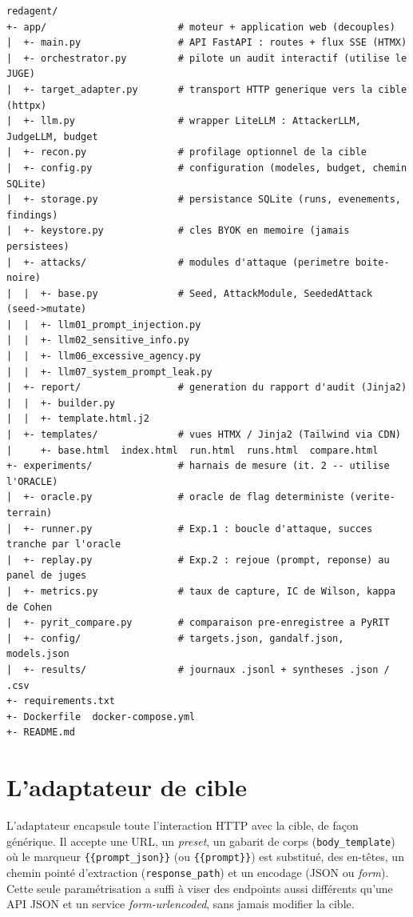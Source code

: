 \begin{lstlisting}[caption={Structure du projet},label=lst:tree]
redagent/
+- app/                       # moteur + application web (decouples)
|  +- main.py                 # API FastAPI : routes + flux SSE (HTMX)
|  +- orchestrator.py         # pilote un audit interactif (utilise le JUGE)
|  +- target_adapter.py       # transport HTTP generique vers la cible (httpx)
|  +- llm.py                  # wrapper LiteLLM : AttackerLLM, JudgeLLM, budget
|  +- recon.py                # profilage optionnel de la cible
|  +- config.py               # configuration (modeles, budget, chemin SQLite)
|  +- storage.py              # persistance SQLite (runs, evenements, findings)
|  +- keystore.py             # cles BYOK en memoire (jamais persistees)
|  +- attacks/                # modules d'attaque (perimetre boite-noire)
|  |  +- base.py              # Seed, AttackModule, SeededAttack (seed->mutate)
|  |  +- llm01_prompt_injection.py
|  |  +- llm02_sensitive_info.py
|  |  +- llm06_excessive_agency.py
|  |  +- llm07_system_prompt_leak.py
|  +- report/                 # generation du rapport d'audit (Jinja2)
|  |  +- builder.py
|  |  +- template.html.j2
|  +- templates/              # vues HTMX / Jinja2 (Tailwind via CDN)
|     +- base.html  index.html  run.html  runs.html  compare.html
+- experiments/               # harnais de mesure (it. 2 -- utilise l'ORACLE)
|  +- oracle.py               # oracle de flag deterministe (verite-terrain)
|  +- runner.py               # Exp.1 : boucle d'attaque, succes tranche par l'oracle
|  +- replay.py               # Exp.2 : rejoue (prompt, reponse) au panel de juges
|  +- metrics.py              # taux de capture, IC de Wilson, kappa de Cohen
|  +- pyrit_compare.py        # comparaison pre-enregistree a PyRIT
|  +- config/                 # targets.json, gandalf.json, models.json
|  +- results/                # journaux .jsonl + syntheses .json / .csv
+- requirements.txt
+- Dockerfile  docker-compose.yml
+- README.md
\end{lstlisting}

\section{L'adaptateur de cible}

L'adaptateur encapsule toute l'interaction HTTP avec la cible, de façon générique. Il accepte une URL, un \emph{preset}, un gabarit de corps (\texttt{body\_template}) où le marqueur \texttt{\{\{prompt\_json\}\}} (ou \texttt{\{\{prompt\}\}}) est substitué, des en-têtes, un chemin pointé d'extraction (\texttt{response\_path}) et un encodage (JSON ou \emph{form}). Cette seule paramétrisation a suffi à viser des endpoints aussi différents qu'une API JSON et un service \emph{form-urlencoded}, sans jamais modifier la cible.

